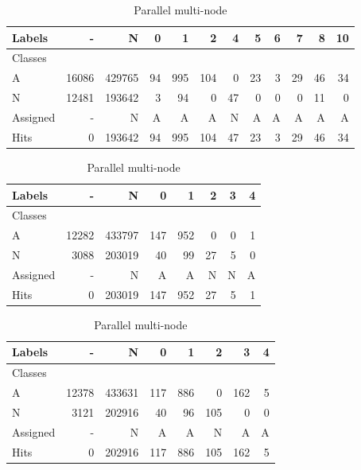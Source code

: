 \begin{table}[htb]
\begin{subtable}[h]{\textwidth}
\begin{center}
\begin{tabular}{l|r|r|r|r|r|r|r|r|r|r|r}
      Labels &      - &       N &   0 &    1 &    2 &   4 &   5 &  6 &   7 &   8 &  10 \\\hline
      Classes  &        &         &     &      &      &     &     &    &     &     &     \\\hline
      \hline
      A        &  16086 &  429765 &  94 &  995 &  104 &   0 &  23 &  3 &  29 &  46 &  34 \\\hline
      N        &  12481 &  193642 &   3 &   94 &    0 &  47 &   0 &  0 &   0 &  11 &   0 \\\hline
      \hline
      Assigned &      - &       N &   A &    A &    A &   N &   A &  A &   A &   A &   A \\\hline
      Hits     &      0 &  193642 &  94 &  995 &  104 &  47 &  23 &  3 &  29 &  46 &  34 
    \end{tabular}
    \label{tab:libc-matrix}
\end{center}\end{subtable}
\begin{subtable}[h]{0.5\textwidth}\begin{center}
  \caption{Parallel single-node}
  \begin{tabular}{l|r|r|r|r|r|r|r}
    Labels &      - &       N &    0 &    1 &   2 &  3 &  4 \\\hline
    Classes  &        &         &      &      &     &    &    \\\hline
    \hline
    A        &  12282 &  433797 &  147 &  952 &   0 &  0 &  1 \\\hline
    N        &   3088 &  203019 &   40 &   99 &  27 &  5 &  0 \\\hline
    \hline
    Assigned &      - &       N &    A &    A &   N &  N &  A \\\hline
    Hits     &      0 &  203019 &  147 &  952 &  27 &  5 &  1 
    \end{tabular}
  \label{tab:single-node-matrix}
\end{center}\end{subtable}
\begin{subtable}[h]{0.5\textwidth}\begin{center}
  \caption{Parallel multi-node}
  \begin{tabular}{l|r|r|r|r|r|r|r}

    Labels &      - &       N &    0 &    1 &    2 &    3 &  4 \\\hline
    Classes  &        &         &      &      &      &      &    \\\hline
    \hline
    A        &  12378 &  433631 &  117 &  886 &    0 &  162 &  5 \\\hline
    N        &   3121 &  202916 &   40 &   96 &  105 &    0 &  0 \\\hline
    \hline
    Assigned &      - &       N &    A &    A &    N &    A &  A \\\hline
    Hits     &      0 &  202916 &  117 &  886 &  105 &  162 &  5 
  \end{tabular}
  \label{tab:multi-node-matrix}
\end{center}\end{subtable}
\end{table}

